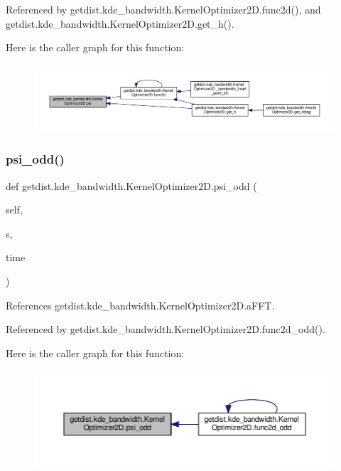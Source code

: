 Referenced by getdist.\+kde\+\_\+bandwidth.\+Kernel\+Optimizer2\+D.\+func2d(), and getdist.\+kde\+\_\+bandwidth.\+Kernel\+Optimizer2\+D.\+get\+\_\+h().

Here is the caller graph for this function\+:
\nopagebreak
\begin{figure}[H]
\begin{center}
\leavevmode
\includegraphics[width=350pt]{classgetdist_1_1kde__bandwidth_1_1KernelOptimizer2D_a7065ba45f5f685a1a6af44d49df74aec_icgraph}
\end{center}
\end{figure}
\mbox{\label{classgetdist_1_1kde__bandwidth_1_1KernelOptimizer2D_a06b7b35353f0875f56bed480c1f6a2f2}} 
\subsubsection{\texorpdfstring{psi\+\_\+odd()}{psi\_odd()}}
{\footnotesize\ttfamily def getdist.\+kde\+\_\+bandwidth.\+Kernel\+Optimizer2\+D.\+psi\+\_\+odd (\begin{DoxyParamCaption}\item[{}]{self,  }\item[{}]{s,  }\item[{}]{time }\end{DoxyParamCaption})}



References getdist.\+kde\+\_\+bandwidth.\+Kernel\+Optimizer2\+D.\+a\+F\+FT.



Referenced by getdist.\+kde\+\_\+bandwidth.\+Kernel\+Optimizer2\+D.\+func2d\+\_\+odd().

Here is the caller graph for this function\+:
\nopagebreak
\begin{figure}[H]
\begin{center}
\leavevmode
\includegraphics[width=350pt]{classgetdist_1_1kde__bandwidth_1_1KernelOptimizer2D_a06b7b35353f0875f56bed480c1f6a2f2_icgraph}
\end{center}
\end{figure}


